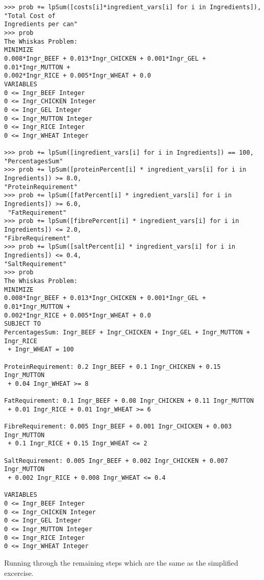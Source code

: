 \documentclass[10pt]{article}
\begin{document}
\begin{verbatim}
>>> prob += lpSum([costs[i]*ingredient_vars[i] for i in Ingredients]), "Total Cost of 
Ingredients per can"
>>> prob
The Whiskas Problem:
MINIMIZE
0.008*Ingr_BEEF + 0.013*Ingr_CHICKEN + 0.001*Ingr_GEL + 0.01*Ingr_MUTTON + 
0.002*Ingr_RICE + 0.005*Ingr_WHEAT + 0.0
VARIABLES
0 <= Ingr_BEEF Integer
0 <= Ingr_CHICKEN Integer
0 <= Ingr_GEL Integer
0 <= Ingr_MUTTON Integer
0 <= Ingr_RICE Integer
0 <= Ingr_WHEAT Integer

>>> prob += lpSum([ingredient_vars[i] for i in Ingredients]) == 100, "PercentagesSum"
>>> prob += lpSum([proteinPercent[i] * ingredient_vars[i] for i in Ingredients]) >= 8.0, 
"ProteinRequirement"
>>> prob += lpSum([fatPercent[i] * ingredient_vars[i] for i in Ingredients]) >= 6.0,
 "FatRequirement"
>>> prob += lpSum([fibrePercent[i] * ingredient_vars[i] for i in Ingredients]) <= 2.0, 
"FibreRequirement"
>>> prob += lpSum([saltPercent[i] * ingredient_vars[i] for i in Ingredients]) <= 0.4, 
"SaltRequirement"
>>> prob
The Whiskas Problem:
MINIMIZE
0.008*Ingr_BEEF + 0.013*Ingr_CHICKEN + 0.001*Ingr_GEL + 0.01*Ingr_MUTTON + 
0.002*Ingr_RICE + 0.005*Ingr_WHEAT + 0.0
SUBJECT TO
PercentagesSum: Ingr_BEEF + Ingr_CHICKEN + Ingr_GEL + Ingr_MUTTON + Ingr_RICE
 + Ingr_WHEAT = 100

ProteinRequirement: 0.2 Ingr_BEEF + 0.1 Ingr_CHICKEN + 0.15 Ingr_MUTTON
 + 0.04 Ingr_WHEAT >= 8

FatRequirement: 0.1 Ingr_BEEF + 0.08 Ingr_CHICKEN + 0.11 Ingr_MUTTON
 + 0.01 Ingr_RICE + 0.01 Ingr_WHEAT >= 6

FibreRequirement: 0.005 Ingr_BEEF + 0.001 Ingr_CHICKEN + 0.003 Ingr_MUTTON
 + 0.1 Ingr_RICE + 0.15 Ingr_WHEAT <= 2

SaltRequirement: 0.005 Ingr_BEEF + 0.002 Ingr_CHICKEN + 0.007 Ingr_MUTTON
 + 0.002 Ingr_RICE + 0.008 Ingr_WHEAT <= 0.4

VARIABLES
0 <= Ingr_BEEF Integer
0 <= Ingr_CHICKEN Integer
0 <= Ingr_GEL Integer
0 <= Ingr_MUTTON Integer
0 <= Ingr_RICE Integer
0 <= Ingr_WHEAT Integer
\end{verbatim}
Running through the remaining steps which are the same as the simplified excercise.
\end{document}
